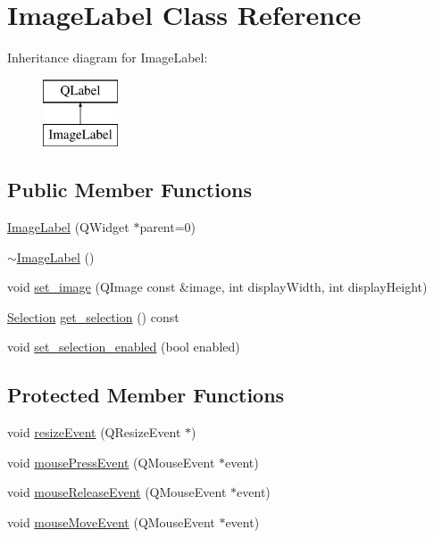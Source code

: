\hypertarget{classImageLabel}{}\section{Image\+Label Class Reference}
\label{classImageLabel}
Inheritance diagram for Image\+Label\+:\begin{figure}[H]
\begin{center}
\leavevmode
\includegraphics[height=2.000000cm]{classImageLabel}
\end{center}
\end{figure}
\subsection*{Public Member Functions}
\begin{DoxyCompactItemize}
\item 
\hyperlink{classImageLabel_a01bf7ab77bbe3d5d3f58b1cdcccc8667}{Image\+Label} (Q\+Widget $\ast$parent=0)
\item 
\hyperlink{classImageLabel_ab0caf7e09b94060541ea364e7c54d156}{$\sim$\+Image\+Label} ()
\item 
void \hyperlink{classImageLabel_acc4767a093d42e4e3eadf9a8ad70617f}{set\+\_\+image} (Q\+Image const \&image, int display\+Width, int display\+Height)
\item 
\hyperlink{structSelection}{Selection} \hyperlink{classImageLabel_ae5558dd558feade7c886a5568d24b5a3}{get\+\_\+selection} () const 
\item 
void \hyperlink{classImageLabel_a1bc29f51b2277bb51d706a95b04beb8b}{set\+\_\+selection\+\_\+enabled} (bool enabled)
\end{DoxyCompactItemize}
\subsection*{Protected Member Functions}
\begin{DoxyCompactItemize}
\item 
void \hyperlink{classImageLabel_a53568d0398cc9e07d67a5cec1da98ad1}{resize\+Event} (Q\+Resize\+Event $\ast$)
\item 
void \hyperlink{classImageLabel_a792567ff559d8e55ab22398e7ef1206d}{mouse\+Press\+Event} (Q\+Mouse\+Event $\ast$event)
\item 
void \hyperlink{classImageLabel_a50f53cf1aa569107e8acc74137afd990}{mouse\+Release\+Event} (Q\+Mouse\+Event $\ast$event)
\item 
void \hyperlink{classImageLabel_a3b57860e8b2778a46ef7700c20c55b64}{mouse\+Move\+Event} (Q\+Mouse\+Event $\ast$event)
\end{DoxyCompactItemize}


